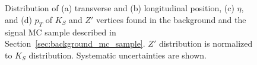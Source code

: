 \begin{figure}[!htb]
    \centering
     \\
     \\
    \caption{Distribution of (a) transverse and (b) longitudinal position, (c) $\eta$, and (d) $p_{T}$ of $K_{S}$ and $Z'$ vertices found in the background and the signal MC sample described in Section~\ref{sec:background_mc_sample}. $Z'$ distribution is normalized to $K_{S}$ distribution. Systematic uncertainties are shown.}
    \label{fig:Ks_zp_comparison}
\end{figure}


